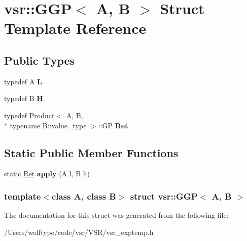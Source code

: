 \hypertarget{structvsr_1_1_g_g_p}{\section{vsr\-:\-:G\-G\-P$<$ A, B $>$ Struct Template Reference}
\label{structvsr_1_1_g_g_p}
}
\subsection*{Public Types}
\begin{DoxyCompactItemize}
\item 
\hypertarget{structvsr_1_1_g_g_p_a80fa547cb3afac9ad0ec3b244cd0d760}{typedef A {\bfseries L}}\label{structvsr_1_1_g_g_p_a80fa547cb3afac9ad0ec3b244cd0d760}

\item 
\hypertarget{structvsr_1_1_g_g_p_a2f3efad1648e51bcfcec7c1a8c8ea9cb}{typedef B {\bfseries H}}\label{structvsr_1_1_g_g_p_a2f3efad1648e51bcfcec7c1a8c8ea9cb}

\item 
\hypertarget{structvsr_1_1_g_g_p_adf9b474d96a795ed9b6f57d1efc9c390}{typedef \hyperlink{structvsr_1_1_product}{Product}$<$ A, B, \\*
typename B\-::value\-\_\-type $>$\-::G\-P {\bfseries Ret}}\label{structvsr_1_1_g_g_p_adf9b474d96a795ed9b6f57d1efc9c390}

\end{DoxyCompactItemize}
\subsection*{Static Public Member Functions}
\begin{DoxyCompactItemize}
\item 
\hypertarget{structvsr_1_1_g_g_p_a835044a3bd785558fe66810b9d9e2342}{static \hyperlink{classvsr_1_1_m_v}{Ret} {\bfseries apply} (A l, B h)}\label{structvsr_1_1_g_g_p_a835044a3bd785558fe66810b9d9e2342}

\end{DoxyCompactItemize}
\subsubsection*{template$<$class A, class B$>$ struct vsr\-::\-G\-G\-P$<$ A, B $>$}



The documentation for this struct was generated from the following file\-:\begin{DoxyCompactItemize}
\item 
/\-Users/wolftype/code/vsr/\-V\-S\-R/vsr\-\_\-exptemp.\-h\end{DoxyCompactItemize}

